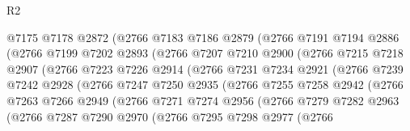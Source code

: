 \begin{lexlean}{R2}
\begin{coremodule}
                    @7175
                    @7178
                    @2872
                    (@2766
                      @7183
                      @7186
                      @2879
                      (@2766
                        @7191
                        @7194
                        @2886
                        (@2766
                          @7199
                          @7202
                          @2893
                          (@2766
                            @7207
                            @7210
                            @2900
                            (@2766
                              @7215
                              @7218
                              @2907
                              (@2766
                                @7223
                                @7226
                                @2914
                                (@2766
                                  @7231
                                  @7234
                                  @2921
                                  (@2766
                                    @7239
                                    @7242
                                    @2928
                                    (@2766
                                      @7247
                                      @7250
                                      @2935
                                      (@2766
                                        @7255
                                        @7258
                                        @2942
                                        (@2766
                                          @7263
                                          @7266
                                          @2949
                                          (@2766
                                            @7271
                                            @7274
                                            @2956
                                            (@2766
                                              @7279
                                              @7282
                                              @2963
                                              (@2766
                                                @7287
                                                @7290
                                                @2970
                                                (@2766
                                                  @7295
                                                  @7298
                                                  @2977
                                                  (@2766

\end{coremodule}
\end{lexlean}

